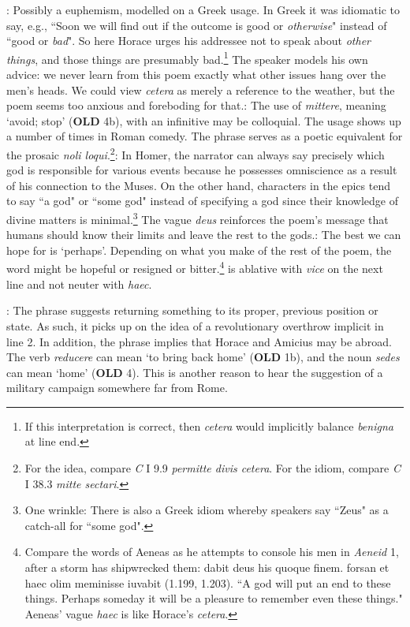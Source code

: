 : Possibly a euphemism, modelled on a Greek usage.  In Greek it was idiomatic to say, e.g.,  ``Soon we will find out if the outcome is good or \textit{otherwise}" instead of ``good or \textit{bad}".  So here Horace urges his addressee not to speak about \textit{other things}, and those things are presumably bad.\footnote{If this interpretation is correct, then \textit{cetera} would implicitly balance \textit{benigna} at line end.}  The speaker models his own advice: we never learn from this poem exactly what other issues hang over the men's heads.  We could view \textit{cetera} as merely a reference to the weather, but the poem seems too anxious and foreboding for that.\indent{}: The use of \textit{mittere}, meaning `avoid; stop' (\textbf{OLD} 4b),  with an infinitive may be colloquial.  The usage shows up a number of times in Roman comedy.  The phrase serves as a poetic equivalent for the prosaic \textit{noli loqui}.\footnote{For the idea, compare \textit{C} I 9.9 \textit{permitte divis cetera}. For the idiom, compare \textit{C} I 38.3 \textit{mitte sectari}.}\indent{}: In Homer, the narrator can always say precisely which god is responsible for various events because he possesses omniscience as a result of his connection to the Muses.  On the other hand, characters in the epics tend to say ``a god" or ``some god" instead of specifying a god since their knowledge of divine matters is minimal.\footnote{One wrinkle: There is also a Greek idiom whereby speakers say ``Zeus" as a catch-all for ``some god".}  The vague \textit{deus} reinforces the poem's message that humans should know their limits and leave the rest to the gods.\indent{}: The best we can hope for is `perhaps'.  Depending on what you make of the rest of the poem, the word might be hopeful or resigned or bitter.\footnote{Compare the words of Aeneas as he attempts to console his men in \textit{Aeneid} 1, after a storm has shipwrecked them: dabit deus his quoque finem. \lips forsan et haec olim meminisse iuvabit (1.199, 1.203).  ``A god will put an end to these things. \lips Perhaps someday it will be a pleasure to remember even these things."  Aeneas' vague \textit{haec} is like Horace's \textit{cetera}.}\indent{} is ablative with \textit{vice} on the next line and not neuter with \textit{haec}.


: The phrase suggests returning something to its proper, previous position or state.  As such, it picks up on the idea of a revolutionary overthrow implicit in line 2.  In addition, the phrase implies that Horace and Amicius may be abroad.  The verb \textit{reducere} can mean `to bring back home' (\textbf{OLD} 1b), and the noun \textit{sedes} can mean `home' (\textbf{OLD} 4).  This is another reason to hear the suggestion of a military campaign somewhere far from Rome.

